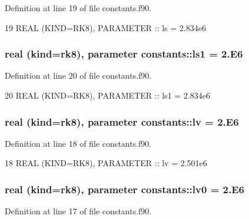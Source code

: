 Definition at line 19 of file constants.\+f90.


\begin{DoxyCode}
19 \textcolor{keywordtype}{REAL (KIND=RK8)}, \textcolor{keywordtype}{PARAMETER}  :: ls       = 2.834e6
\end{DoxyCode}
\subsubsection[{\texorpdfstring{ls1}{ls1}}]{\setlength{\rightskip}{0pt plus 5cm}real (kind=rk8), parameter constants\+::ls1 = 2.\+E6}\hypertarget{namespaceconstants_abf3a57ecb3de0f79c3155c170db798f6}{}\label{namespaceconstants_abf3a57ecb3de0f79c3155c170db798f6}


Definition at line 20 of file constants.\+f90.


\begin{DoxyCode}
20 \textcolor{keywordtype}{REAL (KIND=RK8)}, \textcolor{keywordtype}{PARAMETER}  :: ls1      = 2.834e6
\end{DoxyCode}
\subsubsection[{\texorpdfstring{lv}{lv}}]{\setlength{\rightskip}{0pt plus 5cm}real (kind=rk8), parameter constants\+::lv = 2.\+E6}\hypertarget{namespaceconstants_ab8db38b502faac0658c66b0d0b56c266}{}\label{namespaceconstants_ab8db38b502faac0658c66b0d0b56c266}


Definition at line 18 of file constants.\+f90.


\begin{DoxyCode}
18 \textcolor{keywordtype}{REAL (KIND=RK8)}, \textcolor{keywordtype}{PARAMETER}  :: lv       = 2.501e6
\end{DoxyCode}
\subsubsection[{\texorpdfstring{lv0}{lv0}}]{\setlength{\rightskip}{0pt plus 5cm}real (kind=rk8), parameter constants\+::lv0 = 2.\+E6}\hypertarget{namespaceconstants_afb3befdfd57058ee9d073b832134a601}{}\label{namespaceconstants_afb3befdfd57058ee9d073b832134a601}


Definition at line 17 of file constants.\+f90.


